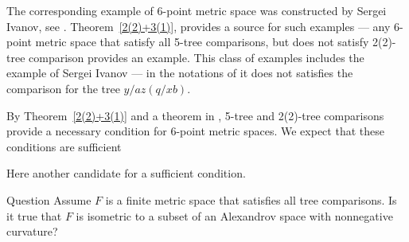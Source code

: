 The corresponding example of 6-point metric space was constructed by Sergei Ivanov, see \cite{AKP}.
Theorem~\ref{2(2)+3(1)}, provides a source for such examples --- any 6-point metric space that satisfy all 5-tree comparisons, but does not satisfy 2(2)-tree comparison provides an example.
This class of examples includes the example of Sergei Ivanov --- in the notations of \cite[7.1]{AKP} it does not satisfies the comparison for the tree $y/az(q/xb)$.

By Theorem~\ref{2(2)+3(1)} and a theorem in \cite{AKP}, 
5-tree and 2(2)-tree comparisons provide a necessary condition for 6-point metric spaces.
We expect that these conditions are sufficient

\begin{center}
\hskip30mm

\end{center}

Here another candidate for a sufficient condition.

\begin{thm}{Question}\label{quest:all-tree}
Assume $F$ is a finite metric space that satisfies all tree comparisons.
Is it true that $F$ is isometric to a subset of an Alexandrov space with nonnegative curvature?
\end{thm}

